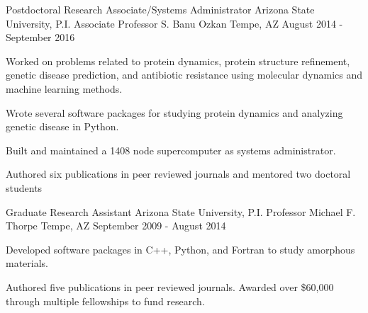 \begin{cventries}
  \cventry
    {Postdoctoral Research Associate/Systems Administrator} %
    {Arizona State University, P.I. Associate Professor S. Banu Ozkan} %
    {Tempe, AZ} %
    {August 2014 - September 2016} %
    {
      \begin{cvitems} %
        \item {Worked on problems related to protein dynamics, protein structure refinement, genetic disease prediction, and antibiotic resistance using molecular dynamics and machine learning methods.}
        \item {Wrote several software packages for studying protein dynamics and analyzing genetic disease in Python.}
        \item {Built and maintained a 1408 node supercomputer as systems administrator.}
        \item {Authored six publications in peer reviewed journals and mentored two doctoral students}
      \end{cvitems}
    }

  \cventry
  {Graduate Research Assistant} %
  {Arizona State University, P.I. Professor Michael F. Thorpe} %
  {Tempe, AZ} %
  {September 2009 - August 2014} %
    {
      \begin{cvitems} %
        \item {Developed software packages in C++, Python, and Fortran to study amorphous materials.}
        \item {Authored five publications in peer reviewed journals. Awarded over \$60,000 through multiple fellowships to fund research.}
      \end{cvitems}
    }


\end{cventries}
